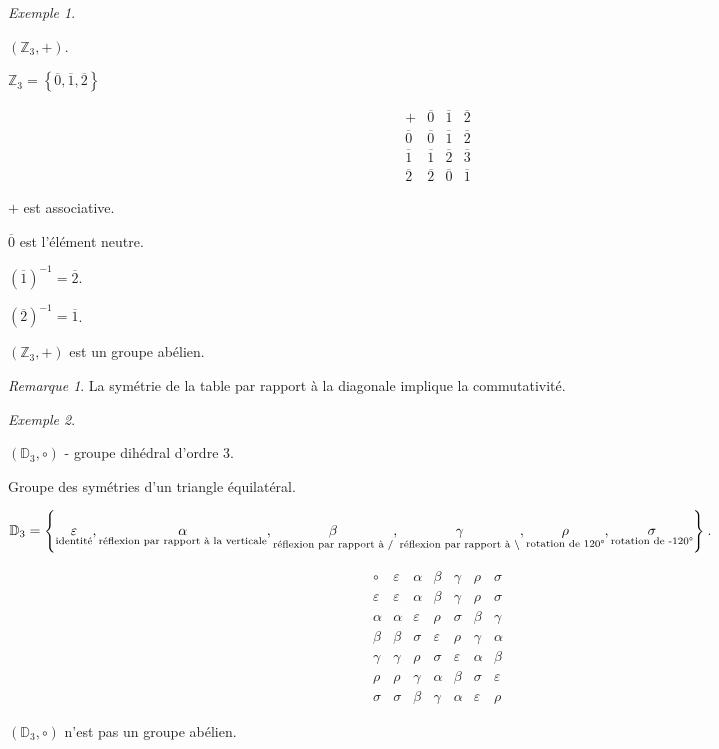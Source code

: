 \documentclass{report}
\newcommand*{\entiers}{\mathbb{Z}}
\theoremstyle{definition}
\theoremstyle{remark}
\newtheorem*{exem}{Exemple}
\newtheorem*{rema}{Remarque}
\begin{document}
	\begin{exem}
		~

		$\left( \entiers_3,+ \right)$.

		$\entiers_3=\left\lbrace \overline{0}, \overline{1}, \overline{2} \right\rbrace$

		\renewcommand{\arraystretch}{1.5}
		\[
		\begin{array}{c||c|c|c}
			+&\overline0&\overline1&\overline2\\
			\hline\hline
			\overline0&\overline0&\overline1&\overline2\\
			\hline
			\overline1&\overline1&\overline2&\overline3\\
			\hline
			\overline2&\overline2&\overline0&\overline1
		\end{array}
		\]
		\renewcommand{\arraystretch}{1}

		$+$ est associative.

		$\overline{0}$ est l'\'el\'ement neutre.

		$(\overline{1})^{-1}=\overline{2}$.

		$(\overline{2})^{-1}=\overline{1}$.

		$\left( \entiers_3,+ \right)$ est un groupe ab\'elien.
		\begin{rema}
			La sym\'etrie de la table par rapport \`a la diagonale implique la commutativit\'e.
		\end{rema}
	\end{exem}
	\begin{exem}
		~

		$\left( \mathbb{D}_3, \circ \right)$ - groupe dih\'edral d'ordre 3.

		Groupe des sym\'etries d'un triangle \'equilat\'eral.

		$\mathbb{D}_3=\left\lbrace \underset{\text{identit\'e}}{\varepsilon}, \underset{\text{r\'eflexion par rapport \`a la verticale}}{\alpha}, \underset{\text{r\'eflexion par rapport \`a /}}{\beta}, \underset{\text{r\'eflexion par rapport \`a \textbackslash}}{\gamma}, \underset{\text{rotation de 120\textdegree}}{\rho}, \underset{\text{rotation de -120\textdegree}}{\sigma} \right\rbrace$.

		\[
		\begin{array}{c||c|c|c|c|c|c}
			\circ&\varepsilon&\alpha&\beta&\gamma&\rho&\sigma\\
			\hline\hline
			\varepsilon&\varepsilon&\alpha&\beta&\gamma&\rho&\sigma\\
			\hline
			\alpha&\alpha&\varepsilon&\rho&\sigma&\beta&\gamma\\
			\hline
			\beta&\beta&\sigma&\varepsilon&\rho&\gamma&\alpha\\
			\hline
			\gamma&\gamma&\rho&\sigma&\varepsilon&\alpha&\beta\\
			\hline
			\rho&\rho&\gamma&\alpha&\beta&\sigma&\varepsilon\\
			\hline
			\sigma&\sigma&\beta&\gamma&\alpha&\varepsilon&\rho
		\end{array}
		\]

		$\left( \mathbb{D}_3, \circ \right)$ n'est pas un groupe ab\'elien.
	\end{exem}
\end{document}
